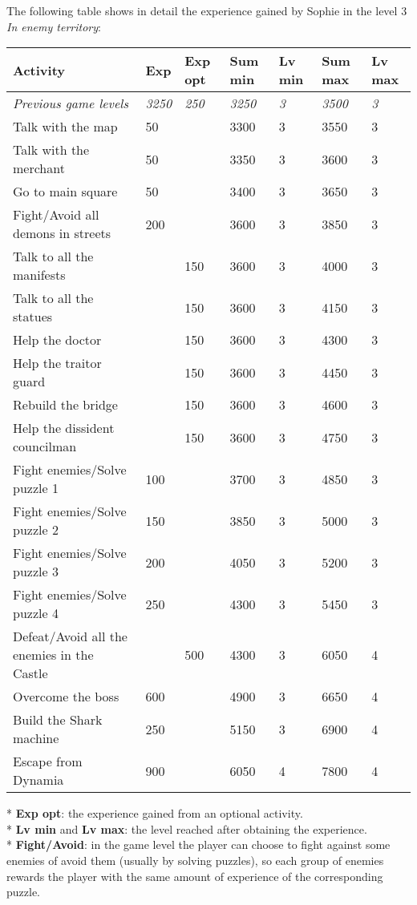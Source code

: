 The following table shows in detail the experience gained by Sophie in the level 3 \textit{In enemy territory}:
\begin{table}[H]
\centering
\begin{tabular}{|p{4cm}|l|l|l|l|l|l|}
\hline
\rowcolor[HTML]{C0C0C0} 
\textbf{Activity} & \textbf{Exp} & \textbf{Exp opt} & \textbf{Sum min} & \textbf{Lv min} & \textbf{Sum max} & \textbf{Lv max} \\ \hline
\textit{Previous game levels} & \textit{3250} & \textit{250} & \textit{3250} & \textit{3} & \textit{3500} & \textit{3} \\ \hline
Talk with the map & 50 &  & 3300 & 3 & 3550 & 3 \\ \hline
Talk with the merchant & 50 &  & 3350 & 3 & 3600 & 3 \\ \hline
Go to main square & 50 &  & 3400 & 3 & 3650 & 3 \\ \hline
Fight/Avoid all demons in streets & 200 &  & 3600 & 3 & 3850 & 3 \\ \hline
Talk to all the manifests &  & 150 & 3600 & 3 & 4000 & 3 \\ \hline
Talk to all the statues &  & 150 & 3600 & 3 & 4150 & 3 \\ \hline
Help the doctor &  & 150 & 3600 & 3 & 4300 & 3 \\ \hline
Help the traitor guard &  & 150 & 3600 & 3 & 4450 & 3 \\ \hline
Rebuild the bridge &  & 150 & 3600 & 3 & 4600 & 3 \\ \hline
Help the dissident councilman &  & 150 & 3600 & 3 & 4750 & 3 \\ \hline
Fight enemies/Solve puzzle 1 & 100 &  & 3700 & 3 & 4850 & 3 \\ \hline
Fight enemies/Solve puzzle 2 & 150 &  & 3850 & 3 & 5000 & 3 \\ \hline
Fight enemies/Solve puzzle 3 & 200 &  & 4050 & 3 & 5200 & 3 \\ \hline
Fight enemies/Solve puzzle 4 & 250 &  & 4300 & 3 & 5450 & 3 \\ \hline
Defeat/Avoid all the enemies in the Castle &  & 500 & 4300 & 3 & 6050 & 4 \\ \hline
Overcome the boss & 600 &  & 4900 & 3 & 6650 & 4 \\ \hline
Build the Shark machine & 250 &  & 5150 & 3 & 6900 & 4 \\ \hline
Escape from Dynamia & 900 &  & 6050 & 4 & 7800 & 4 \\ \hline
\end{tabular}
\end{table}
* \textbf{Exp opt}: the experience gained from an optional activity. \\
* \textbf{Lv min} and \textbf{Lv max}: the level reached after obtaining the experience. \\
* \textbf{Fight/Avoid}: in the game level the player can choose to fight against some enemies of avoid them (usually by solving puzzles), so each group of enemies rewards the player with the same amount of experience of the corresponding puzzle.
